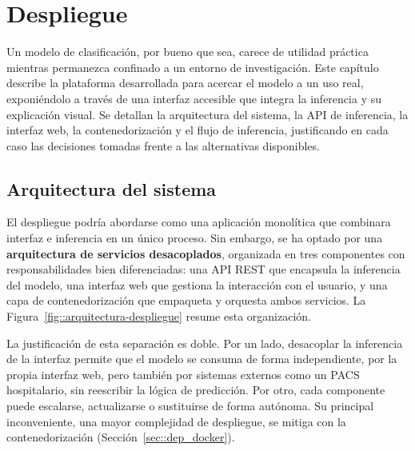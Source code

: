 %
\chapter{Despliegue}
\label{sec::capitulo5}

Un modelo de clasificación, por bueno que sea, carece de utilidad práctica
mientras permanezca confinado a un entorno de investigación. Este capítulo
describe la plataforma desarrollada para acercar el modelo a un uso real,
exponiéndolo a través de una interfaz accesible que integra la inferencia y su
explicación visual. Se detallan la arquitectura del sistema, la API de inferencia,
la interfaz web, la contenedorización y el flujo de inferencia, justificando en
cada caso las decisiones tomadas frente a las alternativas disponibles.


\section{Arquitectura del sistema}
\label{sec::dep_arquitectura}

El despliegue podría abordarse como una aplicación monolítica que combinara
interfaz e inferencia en un único proceso. Sin embargo, se ha optado por una
\textbf{arquitectura de servicios desacoplados}, organizada en tres componentes
con responsabilidades bien diferenciadas: una API REST que encapsula la inferencia
del modelo, una interfaz web que gestiona la interacción con el usuario, y una
capa de contenedorización que empaqueta y orquesta ambos servicios. La
Figura~\ref{fig::arquitectura-despliegue} resume esta organización.

La justificación de esta separación es doble. Por un lado, desacoplar la inferencia
de la interfaz permite que el modelo se consuma de forma independiente, por la
propia interfaz web, pero también por sistemas externos como un PACS hospitalario, 
sin reescribir la lógica de predicción. Por otro, cada componente puede escalarse,
actualizarse o sustituirse de forma autónoma. Su principal inconveniente, una mayor
complejidad de despliegue, se mitiga con la contenedorización
(Sección~\ref{sec::dep_docker}).

